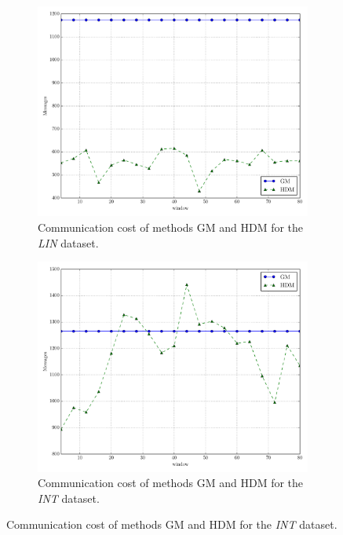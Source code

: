 \begin{figure}[!htb]
\begin{subfigure}{0.32\textwidth}
  \includegraphics[width=\linewidth]{img/main_msg_linear_window.pdf}
  \caption{Communication cost of methods GM and HDM for the \emph{LIN} dataset.}
\end{subfigure}\hfill
\begin{subfigure}{0.32\textwidth}
  \includegraphics[width=\linewidth]{img/main_msg_interweaving_window.pdf}
  \caption{Communication cost of methods GM and HDM for the \emph{INT} dataset.}
\end{subfigure}\hfill

\end{figure}
